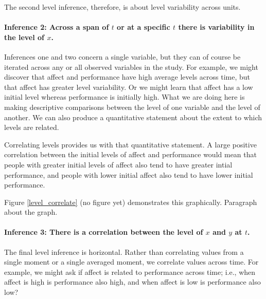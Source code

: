 \documentclass[english,,man]{apa6}
\let\oldparagraph\paragraph
\renewcommand{\paragraph}[1]{\oldparagraph{#1}\mbox{}}
\theoremstyle{definition}
\theoremstyle{definition}
\theoremstyle{definition}
\theoremstyle{remark}
\begin{document}
\noindent The second level inference, therefore, is about level
variability across units.

\hypertarget{inference-2-across-a-span-of-t-or-at-a-specific-t-there-is-variability-in-the-level-of-x.}{%
\paragraph{\texorpdfstring{Inference 2: Across a span of \(t\) or at a
specific \(t\) there is variability in the level of
\(x\).}{Inference 2: Across a span of t or at a specific t there is variability in the level of x.}}\label{inference-2-across-a-span-of-t-or-at-a-specific-t-there-is-variability-in-the-level-of-x.}}

Inferences one and two concern a single variable, but they can of course
be iterated across any or all observed variables in the study. For
example, we might discover that affect and performance have high average
levels across time, but that affect has greater level variability. Or we
might learn that affect has a low initial level whereas performance is
initially high. What we are doing here is making descriptive comparisons
between the level of one variable and the level of another. We can also
produce a quantitative statement about the extent to which levels are
related.

Correlating levels provides us with that quantitative statement. A large
positive correlation between the initial levels of affect and
performance would mean that people with greater initial levels of affect
also tend to have greater intial performance, and people with lower
initial affect also tend to have lower initial performance.

Figure \ref{level_correlate} (no figure yet) demonstrates this
graphically. Paragraph about the graph.

\hypertarget{inference-3-there-is-a-correlation-between-the-level-of-x-and-y-at-t.}{%
\paragraph{\texorpdfstring{Inference 3: There is a correlation between
the level of \(x\) and \(y\) at
\(t\).}{Inference 3: There is a correlation between the level of x and y at t.}}\label{inference-3-there-is-a-correlation-between-the-level-of-x-and-y-at-t.}}

The final level inference is horizontal. Rather than correlating values
from a single moment or a single averaged moment, we correlate values
across time. For example, we might ask if affect is related to
performance across time; i.e., when affect is high is performance also
high, and when affect is low is performance also low?
\end{document}
